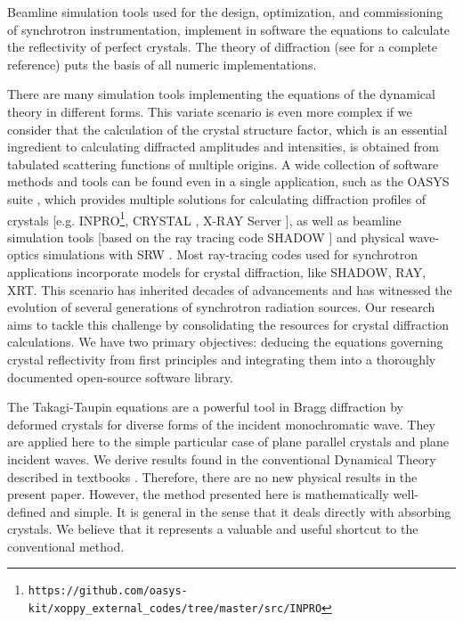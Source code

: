 \documentclass{iucr}
\begin{document}
Beamline simulation tools used for the design, optimization, and commissioning of synchrotron instrumentation, implement in software the equations to calculate the reflectivity of perfect crystals. The theory of diffraction (see \cite{authierbook} for a complete reference) puts the basis of all numeric implementations. 

There are many simulation tools implementing the equations of the dynamical theory in different forms. This variate scenario is even more complex if we consider that the calculation of the crystal structure factor, which is an essential ingredient to calculating diffracted amplitudes and intensities, is obtained from tabulated scattering functions of multiple origins. A wide collection of software methods and tools can be found even in a single application, such as the OASYS suite \cite{codeOASYS}, which provides multiple solutions for calculating diffraction profiles of crystals [e.g. INPRO\footnote{\texttt{https://github.com/oasys-kit/xoppy\_external\_codes/tree/master/src/INPRO}}, CRYSTAL \cite{codeCRYSTAL}, X-RAY Server \cite{codeXRAYserver}], as well as beamline simulation tools [based on the ray tracing code SHADOW \cite{codeSHADOW}] and physical wave-optics simulations with SRW \cite{codeSRW, codeSRWcrystals}.
Most ray-tracing codes used for synchrotron applications incorporate models for crystal diffraction, like SHADOW\cite{codeSHADOW}, RAY\cite{RAYcode1, RAYcode2}, XRT\cite{XRTcode1, XRTcode2}.
This scenario has inherited decades of advancements and has witnessed the evolution of several generations of synchrotron radiation sources.
Our research aims to tackle this challenge by consolidating the resources for crystal diffraction calculations. We have two primary objectives: deducing the equations governing crystal reflectivity from first principles and integrating them into a thoroughly documented open-source software library.

The Takagi-Taupin equations are a powerful tool in Bragg diffraction by deformed crystals for diverse forms of the incident monochromatic wave. They are applied here to the simple particular case of plane parallel crystals and plane incident waves. We derive results found in the conventional Dynamical Theory described in textbooks \cite{ZachariasenBook, pinskerbook, authierbook}. Therefore, there are no new physical results in the present paper. However, the method presented here is mathematically well-defined and simple. It is general in the sense that it deals directly with absorbing crystals. We believe that it represents a valuable and useful shortcut to the conventional method.
\end{document}
